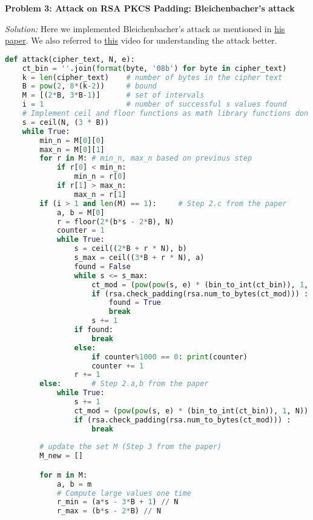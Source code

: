 \documentclass[a4paper, 11pt]{article}
\newenvironment{solution}
    {\textit{Solution:}}
    {}
\newcommand{\prob}[1]{\begin{mdframed}[backgroundcolor=gray!20] \textbf{Problem #1}\end{mdframed}}
\begin{document}
\prob{3: Attack on RSA PKCS Padding: Bleichenbacher's attack}
\begin{solution}
    Here we implemented Bleichenbacher's attack as mentioned in \href{https://archiv.infsec.ethz.ch/education/fs08/secsem/bleichenbacher98.pdf}{his paper}. We also referred to \href{https://youtu.be/iA6OevUmeHk?si=m38o_MBNJr53BtM8}{this} video for understanding the attack better.
    
    \begin{lstlisting}[language=Python, caption=Bleichenbacher's attack]
def attack(cipher_text, N, e):
    ct_bin = ''.join(format(byte, '08b') for byte in cipher_text)
    k = len(cipher_text)    # number of bytes in the cipher text
    B = pow(2, 8*(k-2))     # bound
    M = [(2*B, 3*B-1)]      # set of intervals
    i = 1                   # number of successful s values found
    # Implement ceil and floor functions as math library functions don't work for large integers
    s = ceil(N, (3 * B))
    while True:
        min_n = M[0][0]
        max_n = M[0][1]
        for r in M: # min_n, max_n based on previous step
            if r[0] < min_n:
                min_n = r[0]
            if r[1] > max_n:
                max_n = r[1]
        if (i > 1 and len(M) == 1):     # Step 2.c from the paper 
            a, b = M[0]
            r = floor(2*(b*s - 2*B), N)
            counter = 1
            while True:
                s = ceil((2*B + r * N), b)
                s_max = ceil((3*B + r * N), a)
                found = False
                while s <= s_max:
                    ct_mod = (pow(pow(s, e) * (bin_to_int(ct_bin)), 1, N))
                    if (rsa.check_padding(rsa.num_to_bytes(ct_mod))) : 
                        found = True
                        break
                    s += 1
                if found:
                    break
                else:
                    if counter%1000 == 0: print(counter)
                    counter += 1
                r += 1
        else:       # Step 2.a,b from the paper
            while True:
                s += 1
                ct_mod = (pow(pow(s, e) * (bin_to_int(ct_bin)), 1, N))
                if (rsa.check_padding(rsa.num_to_bytes(ct_mod))) :
                    break
        
        # update the set M (Step 3 from the paper)
        M_new = []

        for m in M:
            a, b = m
            # Compute large values one time
            r_min = (a*s - 3*B + 1) // N
            r_max = (b*s - 2*B) // N


\end{lstlisting}
\end{solution}
\end{document}
